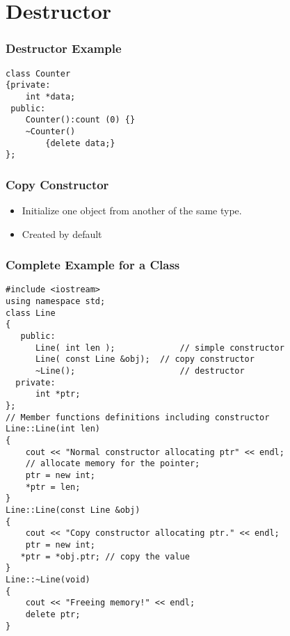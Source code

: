 \documentclass{beamer}
\newtheorem{Key points}{Key points}
\newcommand\Fontvi{\fontsize{5}{6.2}\selectfont}
\newcommand\Fontviaa{\fontsize{8}{7.2}\selectfont}
\begin{document}
\section{Destructor}
\begin{frame}[fragile]
\frametitle{Destructor Example}
\Fontviaa
\begin{lstlisting}
class Counter
{private:
	int *data;
 public:
	Counter():count (0) {}
	~Counter() 
		{delete data;}
};
\end{lstlisting}
\end{frame}
\begin{frame}[fragile]
\frametitle{Copy Constructor}
\begin{itemize}
\item Initialize one object from another of the same type.
\item Created by default
\end{itemize}
\end{frame}
\begin{frame}[fragile]
\frametitle{Complete Example for a Class}
\Fontvi
\begin{lstlisting}
#include <iostream>
using namespace std;
class Line
{
   public:
      Line( int len );             // simple constructor
      Line( const Line &obj);  // copy constructor
      ~Line();                     // destructor
  private:
      int *ptr;
};
// Member functions definitions including constructor
Line::Line(int len)
{
    cout << "Normal constructor allocating ptr" << endl;
    // allocate memory for the pointer;
    ptr = new int;
    *ptr = len;
}
Line::Line(const Line &obj)
{
    cout << "Copy constructor allocating ptr." << endl;
    ptr = new int;
   *ptr = *obj.ptr; // copy the value
}
Line::~Line(void)
{
    cout << "Freeing memory!" << endl;
    delete ptr;
}

\end{lstlisting}
\end{frame}
\end{document}
